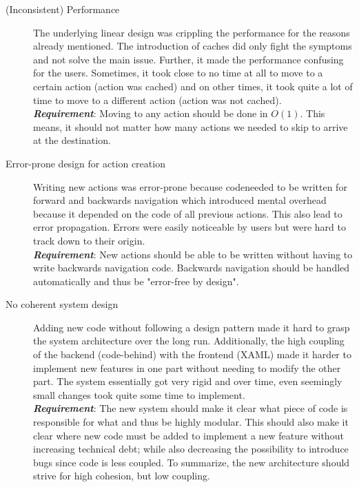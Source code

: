\begin{description}
\item [(Inconsistent) Performance] The underlying linear design was crippling the performance for the reasons already mentioned. The introduction of caches did only fight the symptoms and not solve the main issue. Further, it made the performance confusing for the users. Sometimes, it took close to no time at all to move to a certain action (action was cached) and on other times, it took quite a lot of time to move to a different action (action was not cached). \\
\textit{\textbf{Requirement}}: Moving to any action should be done in $O(1)$. This means, it should not matter how many actions we needed to skip to arrive at the destination.
\item [Error-prone design for action creation] Writing new actions was error-prone because codeneeded to be written for forward and backwards navigation which introduced mental overhead because it depended on the code of all previous actions. This also lead to error propagation. Errors were easily noticeable by users but were hard to track down to their origin.\\
\textit{\textbf{Requirement}}: New actions should be able to be written without having to write backwards navigation code. Backwards navigation should be handled automatically and thus be "error-free by design".
\item [No coherent system design] Adding new code without following a design pattern made it hard to grasp the system architecture over the long run. Additionally, the high coupling of the backend (code-behind) with the frontend (XAML) made it harder to implement new features in one part without needing to modify the other part. The system essentially got very rigid and over time, even seemingly small changes took quite some time to implement.\\
\textit{\textbf{Requirement}}: The new system should make it clear what piece of code is responsible for what and thus be highly modular. This should also make it clear where new code must be added to implement a new feature without increasing technical debt; while also decreasing the possibility to introduce bugs since code is less coupled. To summarize, the new architecture should strive for high cohesion, but low coupling.
\end{description}

